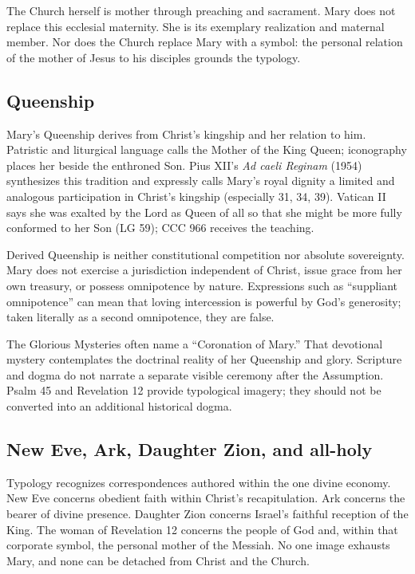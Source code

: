 The Church herself is mother through preaching and sacrament. Mary does not replace this ecclesial maternity. She is its exemplary realization and maternal member. Nor does the Church replace Mary with a symbol: the personal relation of the mother of Jesus to his disciples grounds the typology.

\subsection{Queenship}

Mary's Queenship derives from Christ's kingship and her relation to him. Patristic and liturgical language calls the Mother of the King Queen; iconography places her beside the enthroned Son. Pius XII's \emph{Ad caeli Reginam} (1954) synthesizes this tradition and expressly calls Mary's royal dignity a limited and analogous participation in Christ's kingship (especially 31, 34, 39). Vatican II says she was exalted by the Lord as Queen of all so that she might be more fully conformed to her Son (LG 59); CCC 966 receives the teaching.

Derived Queenship is neither constitutional competition nor absolute sovereignty. Mary does not exercise a jurisdiction independent of Christ, issue grace from her own treasury, or possess omnipotence by nature. Expressions such as ``suppliant omnipotence'' can mean that loving intercession is powerful by God's generosity; taken literally as a second omnipotence, they are false.

The Glorious Mysteries often name a ``Coronation of Mary.'' That devotional mystery contemplates the doctrinal reality of her Queenship and glory. Scripture and dogma do not narrate a separate visible ceremony after the Assumption. Psalm 45 and Revelation 12 provide typological imagery; they should not be converted into an additional historical dogma.

\subsection{New Eve, Ark, Daughter Zion, and all-holy}

Typology recognizes correspondences authored within the one divine economy. New Eve concerns obedient faith within Christ's recapitulation. Ark concerns the bearer of divine presence. Daughter Zion concerns Israel's faithful reception of the King. The woman of Revelation 12 concerns the people of God and, within that corporate symbol, the personal mother of the Messiah. No one image exhausts Mary, and none can be detached from Christ and the Church.

